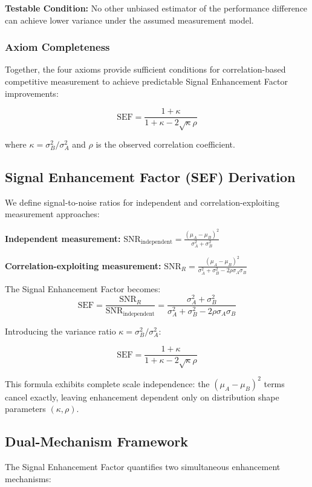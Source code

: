 \textbf{Testable Condition:} No other unbiased estimator of the performance difference can achieve lower variance under the assumed measurement model.

\subsubsection{Axiom Completeness}
Together, the four axioms provide sufficient conditions for correlation-based competitive measurement to achieve predictable Signal Enhancement Factor improvements:

$$\text{SEF} = \frac{1 + \kappa}{1 + \kappa - 2\sqrt{\kappa}\rho}$$

where $\kappa = \sigma_B^2/\sigma_A^2$ and $\rho$ is the observed correlation coefficient.

\subsection{Signal Enhancement Factor (SEF) Derivation}

We define signal-to-noise ratios for independent and correlation-exploiting measurement approaches:

\textbf{Independent measurement:} $\text{SNR}_{\text{independent}} = \frac{(\mu_A - \mu_B)^2}{\sigma_A^2 + \sigma_B^2}$

\textbf{Correlation-exploiting measurement:} $\text{SNR}_R = \frac{(\mu_A - \mu_B)^2}{\sigma_A^2 + \sigma_B^2 - 2\rho\sigma_A\sigma_B}$

The Signal Enhancement Factor becomes:
$$\text{SEF} = \frac{\text{SNR}_R}{\text{SNR}_{\text{independent}}} = \frac{\sigma_A^2 + \sigma_B^2}{\sigma_A^2 + \sigma_B^2 - 2\rho\sigma_A\sigma_B}$$

Introducing the variance ratio $\kappa = \sigma_B^2/\sigma_A^2$:

$$\text{SEF} = \frac{1 + \kappa}{1 + \kappa - 2\sqrt{\kappa}\rho}$$

This formula exhibits complete scale independence: the $(\mu_A - \mu_B)^2$ terms cancel exactly, leaving enhancement dependent only on distribution shape parameters $(\kappa, \rho)$.

\subsection{Dual-Mechanism Framework}

The Signal Enhancement Factor quantifies two simultaneous enhancement mechanisms:

